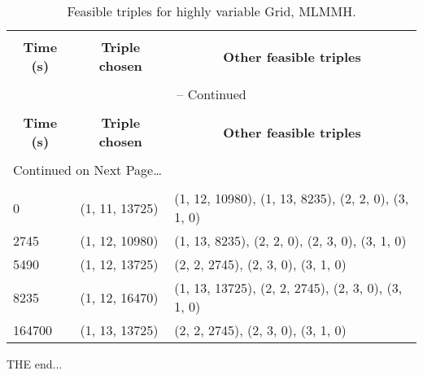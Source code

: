 \documentclass[12pt]{article}
\begin{document}
\begin{center}
	\begin{longtable}{lll}
		\caption[Feasible triples for a highly variable Grid]{Feasible triples
			for highly variable Grid, MLMMH.}
		\label{grid_mlmmh} \\
		
		\hline \hline \\[2ex]
		\multicolumn{1}{c}{\textbf{Time (s)}} &
		\multicolumn{1}{c}{\textbf{Triple chosen}} &
		\multicolumn{1}{c}{\textbf{Other feasible triples}} \\[0.5ex] \hline
		\\[-1.8ex]
		\endfirsthead
		
		\multicolumn{3}{c}{{\tablename} \thetable{} -- Continued} \\[0.5ex]
		\hline \hline \\[-2ex]
		\multicolumn{1}{c}{\textbf{Time (s)}} &
		\multicolumn{1}{c}{\textbf{Triple chosen}} &
		\multicolumn{1}{c}{\textbf{Other feasible triples}} \\[0.5ex] \hline
		\\[-1.8ex]
		\endhead
		
		\multicolumn{3}{l}{{Continued on Next Page\ldots}} \\
		\endfoot
		
		\\[-1.8ex] \hline \hline
		\endlastfoot
		
		0      & (1, 11, 13725) & (1, 12, 10980), (1, 13, 8235), (2, 2, 0), (3, 1, 0) \\
		2745   & (1, 12, 10980) & (1, 13, 8235), (2, 2, 0), (2, 3, 0), (3, 1, 0) \\
		5490   & (1, 12, 13725) & (2, 2, 2745), (2, 3, 0), (3, 1, 0) \\
		8235   & (1, 12, 16470) & (1, 13, 13725), (2, 2, 2745), (2, 3, 0), (3, 1, 0) \\
		164700 & (1, 13, 13725) & (2, 2, 2745), (2, 3, 0), (3, 1, 0) \\
	\end{longtable}
\end{center}

THE end...
\end{document}
